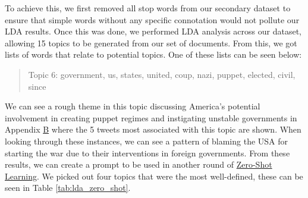 To achieve this, we first removed all stop words from our secondary dataset to ensure that simple words without any specific connotation would not pollute our LDA results. Once this was done, we performed LDA analysis across our dataset, allowing 15 topics to be generated from our set of documents. From this, we got lists of words that relate to potential topics. One of these lists can be seen below:

\begin{quote}
    Topic 6: government, us, states, united, coup, nazi, puppet, elected, civil, since
    \label{quote:topic_6}
\end{quote}

We can see a rough theme in this topic discussing America's potential involvement in creating puppet regimes and instigating unstable governments in Appendix \hyperref[app:lda_results]{B} where the 5 tweets most associated with this topic are shown. When looking through these instances, we can see a pattern of blaming the USA for starting the war due to their interventions in foreign governments. From these results, we can create a prompt to be used in another round of \hyperref[zero_shot]{Zero-Shot Learning}. We picked out four topics that were the most well-defined, these can be seen in Table \ref{tab:lda_zero_shot}.

\begin{table}[htbp]
    \tiny
    \caption{Topics prompts created for Zero-Shot learning, generated through LDA analysis. Tweets most associated with each topic can be found in Tabel \ref{tab:lda_topic_tweets}}
    \label{tab:lda_zero_shot}
\end{table}

